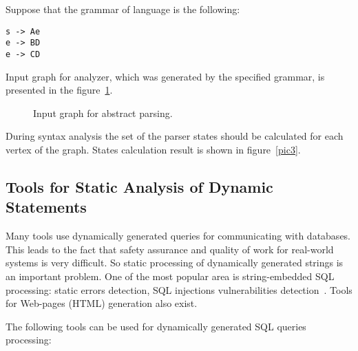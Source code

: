 \documentclass{acm_proc_article-sp}
\begin{document}
Suppose that the grammar of language is the following:

\begin{verbatim} 
s -> Ae
e -> BD
e -> CD
\end{verbatim}
 
Input graph for analyzer, which was generated by the specified grammar, is presented in the figure~\ref{pic2}.

\begin{figure}
    \centering
    \caption{Input graph for abstract parsing.}
    \label{pic2}
\end{figure}

During syntax analysis the set of the parser states should be calculated for each vertex of the graph. States calculation result is shown in figure~\ref{pic3}.
 
\begin{figure*}
    \centering
    \caption{Parser states for graph in figure~\ref{pic2}.}
    \label{pic3}
\end{figure*}


\subsection{Tools for Static Analysis of Dynamic Statements}

Many tools use dynamically generated queries for communicating with databases. This leads to the fact that safety assurance and quality of work for real-world systems is very difficult. So static processing of dynamically generated strings is an important problem. One of the most popular area is string-embedded SQL processing: static errors detection, SQL injections vulnerabilities detection~\cite{Fu:2007:SAF:1299135.1299784}. Tools for Web-pages (HTML) generation also exist.

The following tools can be used for dynamically generated SQL queries processing:
\end{document}
